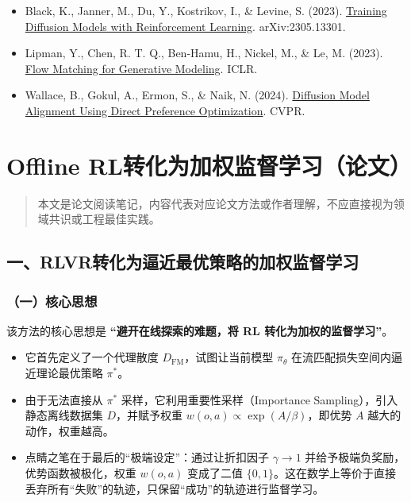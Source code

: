 \begin{itemize}
\tightlist
\item
  Black, K., Janner, M., Du, Y., Kostrikov, I., \& Levine, S. (2023). \href{https://arxiv.org/abs/2305.13301}{Training Diffusion Models with Reinforcement Learning}. arXiv:2305.13301.
\item
  Lipman, Y., Chen, R. T. Q., Ben-Hamu, H., Nickel, M., \& Le, M. (2023). \href{https://arxiv.org/abs/2210.02747}{Flow Matching for Generative Modeling}. ICLR.
\item
  Wallace, B., Gokul, A., Ermon, S., \& Naik, N. (2024). \href{https://arxiv.org/abs/2311.12908}{Diffusion Model Alignment Using Direct Preference Optimization}. CVPR.
\end{itemize}

\clearpage

\hypertarget{offline-rlux8f6cux5316ux4e3aux52a0ux6743ux76d1ux7763ux5b66ux4e60ux8bbaux6587}{%
\section{Offline RL转化为加权监督学习（论文）}\label{offline-rlux8f6cux5316ux4e3aux52a0ux6743ux76d1ux7763ux5b66ux4e60ux8bbaux6587}}

\begin{quote}
本文是论文阅读笔记，内容代表对应论文方法或作者理解，不应直接视为领域共识或工程最佳实践。
\end{quote}

\hypertarget{ux4e00rlvrux8f6cux5316ux4e3aux903cux8fd1ux6700ux4f18ux7b56ux7565ux7684ux52a0ux6743ux76d1ux7763ux5b66ux4e60}{%
\subsection{一、RLVR转化为逼近最优策略的加权监督学习}\label{ux4e00rlvrux8f6cux5316ux4e3aux903cux8fd1ux6700ux4f18ux7b56ux7565ux7684ux52a0ux6743ux76d1ux7763ux5b66ux4e60}}

\hypertarget{ux4e00ux6838ux5fc3ux601dux60f3-18}{%
\subsubsection{（一）核心思想}\label{ux4e00ux6838ux5fc3ux601dux60f3-18}}

该方法的核心思想是 \textbf{``避开在线探索的难题，将 RL 转化为加权的监督学习''}。

\begin{itemize}
\tightlist
\item
  它首先定义了一个代理散度 \(D_{\mathrm{FM}}\)，试图让当前模型 \(\pi_\theta\) 在流匹配损失空间内逼近理论最优策略 \(\pi^{*}\)。
\item
  由于无法直接从 \(\pi^{*}\) 采样，它利用重要性采样（Importance Sampling），引入静态离线数据集 \(D\)，并赋予权重 \(w(o, a) \propto \exp(A / \beta)\)，即优势 \(A\) 越大的动作，权重越高。
\item
  点睛之笔在于最后的``极端设定''：通过让折扣因子 \(\gamma \to 1\) 并给予极端负奖励，优势函数被极化，权重 \(w(o, a)\) 变成了二值 \(\{0, 1\}\)。这在数学上等价于直接丢弃所有``失败''的轨迹，只保留``成功''的轨迹进行监督学习。
\end{itemize}

